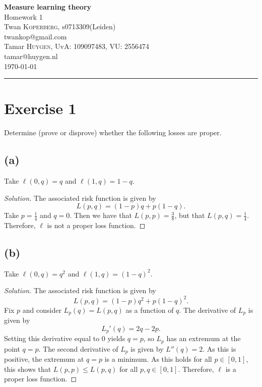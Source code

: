 \documentclass[10pt, a4paper, twoside]{amsart}
\makeatletter
\newenvironment{solution}
               {\let\oldqedsymbol=\qedsymbol
                \renewcommand{\qedsymbol}{$\blacktriangleleft$}
                \begin{proof}[Solution]}
               {\end{proof}
                \renewcommand{\qedsymbol}{\oldqedsymbol}}
\newcommand{\firstName}  {Twan}
\newcommand{\lastName}   {Koperberg}
\newcommand{\studId}     {0713309}
\renewcommand{\email}    {twankop@gmail.com}
\makeatother
\begin{document}
\begin{center}
  {\huge\bf Measure learning theory}\\
  {\large\sc Homework 1 }\\ \vspace{1em}
  \firstName \textsc{ \lastName}, {\sc s}\studId (Leiden)\\
  \email\text{}\\ \smallskip
  Tamar \textsc{ Huygen}, UvA: 109097483, VU: 2556474\\
  tamar@huygen.nl \\ \bigskip
  \today \\\bigskip
  \hrule
  \bigskip
\end{center}

\section*{Exercise 1}
Determine (prove or disprove) whether the following losses are proper.
\subsection*{(a)}
Take $\ell(0,q)=q$ and $\ell(1,q)=1-q$.
\begin{solution}
The associated risk function is given by
\begin{equation*}
L(p,q)=(1-p)q+p(1-q).
\end{equation*}
Take $p=\tfrac{1}{4}$ and $q=0$. Then we have that $L(p,p)=\tfrac{3}{8}$, but that $L(p,q)=\tfrac{1}{4}$.
Therefore, $\ell$ is not a proper loss function.
\end{solution}

\subsection*{(b)}
Take $\ell(0,q)=q^2$ and $\ell(1,q)=(1-q)^2$.
\begin{solution}
The associated risk function is given by
\begin{equation*}
L(p,q)=(1-p)q^2+p(1-q)^2.
\end{equation*}
Fix $p$ and consider $L_p(q)=L(p,q)$ as a function of $q$.
The derivative of $L_p$ is given by
\begin{equation*}
L_p'(q)=2q-2p.
\end{equation*}
Setting this derivative equal to $0$ yields $q=p$, so $L_p$ has an extremum at the point $q=p$.
The second derivative of $L_p$ is given by $L''(q)=2$.
As this is positive, the extremum at $q=p$ is a minimum. 
As this holds for all $p \in [0,1]$, this shows that $L(p,p) \leq L(p,q)$ for all $p,q \in [0,1]$.
Therefore, $\ell$ is a proper loss function.
\end{solution}
\end{document}
